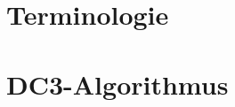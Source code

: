 \documentclass[12pt]{report}
\begin{document}
\section{Terminologie}
\label{sec:Terminologie}

\section{DC3-Algorithmus}
\label{sec:DC3Algorithmus}



\nocite{*}
\end{document}
